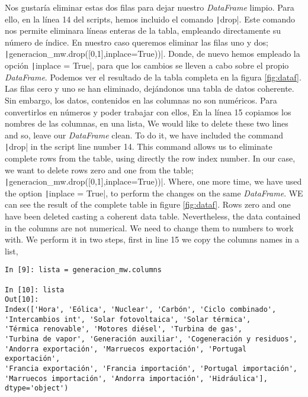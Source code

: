\begin{paracol}{2}
Nos gustaría eliminar estas dos filas para dejar nuestro \emph{DataFrame} limpio. Para ello, en la línea 14 del scripts, hemos incluido el comando \texttt|drop|. Este comando nos permite eliminara líneas enteras de la tabla, empleando directamente su número de índice. En nuestro caso queremos eliminar las filas uno y dos; \texttt|generacion_mw.drop([0,1],inplace=True))|. Donde, de nuevo hemos empleado la opción \texttt|inplace = True|, para que los cambios se lleven a cabo sobre el propio 	\emph{DataFrame}. 
Podemos ver el resultado de la tabla completa en la figura \ref{fig:dataf}. Las filas cero y uno se han eliminado, dejándonos una tabla de datos coherente. 
Sin embargo, los datos, contenidos en las columnas no son numéricos. Para convertirlos en números y poder trabajar con ellos,
En la línea 15 copiamos los nombres de las columnas, en una lista, 
\switchcolumn
We would like to delete these two lines and so, leave our \emph{DataFrame} clean. To do it, we have included the command \texttt|drop| in the script line number 14. This command allows us to eliminate complete rows from the table, using directly the row index number. In our case, we want to delete rows zero and one from the table;\\ \texttt|generacion_mw.drop([0,1],inplace=True))|. Where, one more time, we have used the option  \texttt|inplace = True|, to perform the changes on the same \emph{DataFrame}. WE can see the result of the complete table in figure \ref{fig:dataf}. Rows zero and one have been deleted casting a coherent data table.
Nevertheless, the data contained in the columns are not numerical. We need to change them to numbers to work with. We perform it in two steps, first in line 15 we copy the columns names in a list,                  

\end{paracol}

\begin{center}
	\begin{minipage}{0.7\textwidth}
		\begin{verbatim}
In [9]: lista = generacion_mw.columns

In [10]: lista
Out[10]: 
Index(['Hora', 'Eólica', 'Nuclear', 'Carbón', 'Ciclo combinado',
'Intercambios int', 'Solar fotovoltaica', 'Solar térmica',
'Térmica renovable', 'Motores diésel', 'Turbina de gas',
'Turbina de vapor', 'Generación auxiliar', 'Cogeneración y residuos',
'Andorra exportación', 'Marruecos exportación', 'Portugal exportación',
'Francia exportación', 'Francia importación', 'Portugal importación',
'Marruecos importación', 'Andorra importación', 'Hidráulica'],
dtype='object')									 	
		\end{verbatim}
	\end{minipage}
\end{center}

